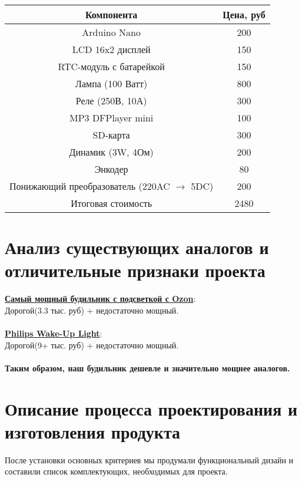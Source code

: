 \documentclass[12pt,a4paper]{article}
\begin{document}
\begin{tabular}{|c|c|}
    \hline
    Компонента & Цена, руб \\ \hline
    Arduino Nano & 200 \\ \hline
    LCD 16x2 дисплей & 150 \\ \hline 
    RTC-модуль с батарейкой & 150 \\ \hline
    Лампа (100 Ватт) & 800 \\ \hline
    Реле (250В, 10А) & 300 \\ \hline 
    MP3 DFPlayer mini & 100 \\ \hline 
    SD-карта & 300 \\ \hline
    Динамик (3W, 4Ом) & 200 \\ \hline 
    Энкодер & 80 \\ \hline
    Понижающий преобразователь (220AC $\rightarrow$ 5DC) & 200 \\ \hline
    Итоговая стоимость & 2480 \\ \hline
\end{tabular}

\section{Анализ существующих аналогов и отличительные признаки проекта}

\href{https://www.ozon.ru/product/nochnik-umnyy-budilnik-imitiruet-voshod-solntsa-elektronnyy-budilnik-s-reguliruemoy-sensornoy-1627021430/}{\textbf{Самый мощный будильник с подсветкой с Ozon}}: \\
Дорогой(3.3 тыс. руб) + недостаточно мощный.
\\
\\
\href{https://www.philips.ru/c-m-hs/light-therapy}{\textbf{Philips Wake-Up Light}}: \\
Дорогой(9+ тыс. руб) + недостаточно мощный.
\\ \\
\textbf{Таким образом, наш будильник дешевле и значительно мощнее аналогов.}

\section{Описание процесса проектирования и изготовления продукта}

После установки основных критериев мы продумали функциональный дизайн и составили список комплектующих, необходимых для проекта. 
\end{document}
